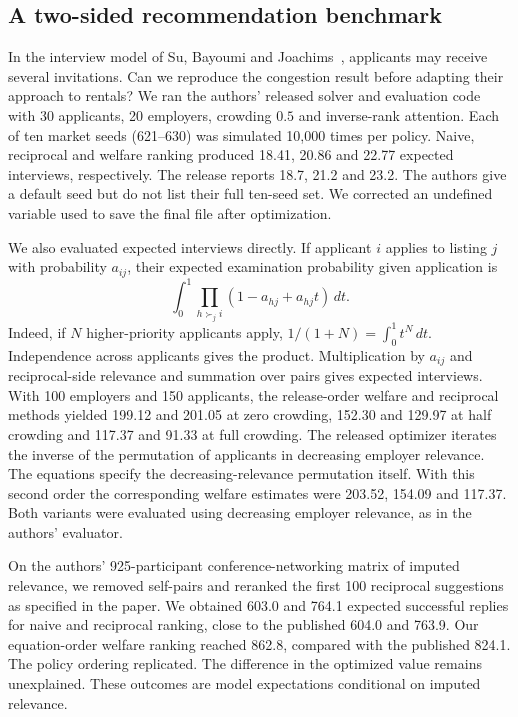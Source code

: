 \subsection{A two-sided recommendation benchmark}
\label{app:su-replication}
In the interview model of Su, Bayoumi and Joachims~\cite{rankings}, applicants may receive several invitations. Can we reproduce the congestion result before adapting their approach to rentals? We ran the authors' released solver and evaluation code with 30 applicants, 20 employers, crowding $0.5$ and inverse-rank attention. Each of ten market seeds (621--630) was simulated 10,000 times per policy. Naive, reciprocal and welfare ranking produced 18.41, 20.86 and 22.77 expected interviews, respectively. The release reports 18.7, 21.2 and 23.2. The authors give a default seed but do not list their full ten-seed set. We corrected an undefined variable used to save the final file after optimization.

We also evaluated expected interviews directly. If applicant $i$ applies to listing $j$ with probability $a_{ij}$, their expected examination probability given application is
\[
  \int_0^1 \prod_{h\succ_j i}(1-a_{hj}+a_{hj}t)\,dt.
\]
Indeed, if $N$ higher-priority applicants apply, $1/(1+N)=\int_0^1 t^N\,dt$. Independence across applicants gives the product. Multiplication by $a_{ij}$ and reciprocal-side relevance and summation over pairs gives expected interviews. With 100 employers and 150 applicants, the release-order welfare and reciprocal methods yielded 199.12 and 201.05 at zero crowding, 152.30 and 129.97 at half crowding and 117.37 and 91.33 at full crowding. The released optimizer iterates the inverse of the permutation of applicants in decreasing employer relevance. The equations specify the decreasing-relevance permutation itself. With this second order the corresponding welfare estimates were 203.52, 154.09 and 117.37. Both variants were evaluated using decreasing employer relevance, as in the authors' evaluator.

On the authors' 925-participant conference-networking matrix of imputed relevance, we removed self-pairs and reranked the first 100 reciprocal suggestions as specified in the paper. We obtained 603.0 and 764.1 expected successful replies for naive and reciprocal ranking, close to the published 604.0 and 763.9. Our equation-order welfare ranking reached 862.8, compared with the published 824.1. The policy ordering replicated. The difference in the optimized value remains unexplained. These outcomes are model expectations conditional on imputed relevance.

